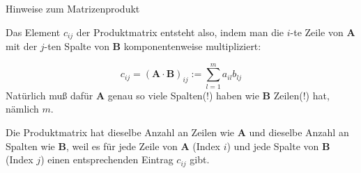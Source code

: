 \begin{frame}{Hinweise zum Matrizenprodukt}
	\begin{bemerkung}
	Das Element $c_{ij}$ der Produktmatrix entsteht also, indem man die $i$-te Zeile von $\pmb{A}$ mit der $j$-ten Spalte von $\pmb{B}$ komponentenweise multipliziert:

\[
c_{ij} = \left( \pmb{A} \cdot \pmb{B} \right)_{ij} := \sum_{l=1}^{m} a_{il} b_{lj}
\]	
	Natürlich muß  dafür $\pmb{A}$ genau so viele Spalten(!) haben wie $\pmb{B}$ Zeilen(!) hat, nämlich $m$.
	
	Die Produktmatrix hat dieselbe Anzahl an Zeilen wie $\pmb{A}$ und dieselbe Anzahl an Spalten wie $\pmb{B}$, weil es für jede Zeile von $\pmb{A}$ (Index $i$) und jede Spalte von $\pmb{B}$ (Index $j$) einen entsprechenden Eintrag $c_{ij}$ gibt.	
	
	\end{bemerkung}
\end{frame}

